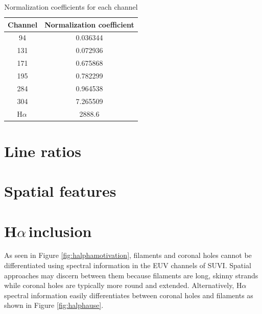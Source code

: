 \documentclass[twoside]{report}
\newcommand{\halpha}{H$\alpha$\,}
\newcommand{\todo}[1]{{\color{red}{\textbf{#1}}}}
\begin{document}
\begin{table}[ht!]
\centering
 \begin{tabular}{|c c |} 
 \hline
 Channel & Normalization coefficient\\
   \hline
   94 &  0.036344 \\
   131 & 0.072936 \\
   171 & 0.675868 \\
   195 & 0.782299 \\
   284 & 0.964538 \\
   304 & 7.265509 \\
   \halpha & 2888.6 \\
 \hline
 \end{tabular}
 \caption{Normalization coefficients for each channel}
 \label{tab:normcoefficients}
\end{table}


\section{Line ratios}

\section{Spatial features}
\todo{copy from notes}

\section{\halpha inclusion}\label{sec:halphainclusion}
As seen in Figure \ref{fig:halphamotivation}, filaments and coronal holes cannot be differentiated using spectral information in the EUV channels of SUVI. Spatial approaches may discern between them because filaments are long, skinny strands while coronal holes are typically more round and extended. Alternatively, \halpha spectral information easily differentiates between coronal holes and filaments as shown in Figure \ref{fig:halphause}. 
\end{document}
